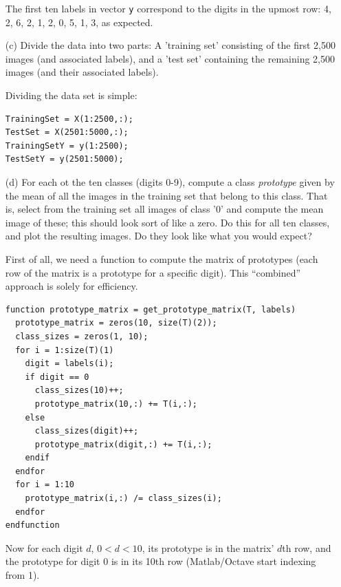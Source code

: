 \documentclass[10pt]{article}
\begin{document}
\begin{itemize}
The first ten labels in vector \texttt{y} correspond to the digits in the upmost row:  4, 2, 6, 2, 1, 2, 0, 5, 1, 3, as expected.

\color{blue}
\item[(c)] Divide the data into two parts: A 'training set' consisting of the first 2,500 images (and associated labels), and a 'test set' containing the remaining 2,500 images (and their associated labels).

\color{black}
Dividing the data set is simple:
\begin{verbatim}
TrainingSet = X(1:2500,:);
TestSet = X(2501:5000,:);
TrainingSetY = y(1:2500);
TestSetY = y(2501:5000);
\end{verbatim}

\color{blue}
\item[(d)] For each ot the ten classes (digits 0-9), compute a class \textit{prototype} given by the mean of all the images in the training set that belong to this class. That is, select from the training set all images of class '0' and compute the mean image of these; this should look sort of like a zero. Do this for all ten classes, and plot the resulting images. Do they look like what you would expect?

\color{black}
First of all, we need a function to compute the matrix of prototypes (each row of the matrix is a prototype for a specific digit). This ``combined'' approach is solely for efficiency.
\begin{verbatim}
function prototype_matrix = get_prototype_matrix(T, labels)
  prototype_matrix = zeros(10, size(T)(2));
  class_sizes = zeros(1, 10);
  for i = 1:size(T)(1)
    digit = labels(i);
    if digit == 0
      class_sizes(10)++;
      prototype_matrix(10,:) += T(i,:);
    else
      class_sizes(digit)++;
      prototype_matrix(digit,:) += T(i,:);
    endif
  endfor
  for i = 1:10
    prototype_matrix(i,:) /= class_sizes(i);
  endfor
endfunction
\end{verbatim}
Now for each digit $d$, $0 < d < 10$, its prototype is in the matrix' $d$th row, and the prototype for digit 0 is in its 10th row (Matlab/Octave start indexing from 1).


\end{itemize}
\end{document}
